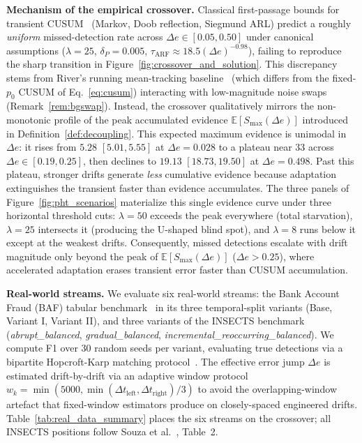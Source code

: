 \documentclass[10pt,conference]{IEEEtran}
\theoremstyle{definition}
\begin{document}
\textbf{Mechanism of the empirical crossover.}
Classical first-passage bounds for transient CUSUM~\cite{tartakovsky_2023_transient,tartakovsky_2014} (Markov, Doob reflection, Siegmund ARL) predict a roughly \emph{uniform} missed-detection rate across $\Delta e \in [0.05, 0.50]$ under canonical assumptions ($\lambda=25$, $\delta_P=0.005$, $\tau_{\mathrm{ARF}} \approx 18.5(\Delta e)^{-0.98}$), failing to reproduce the sharp transition in Figure~\ref{fig:crossover_and_solution}. This discrepancy stems from River's running mean-tracking baseline~\cite{montiel_river_2021} (which differs from the fixed-$p_0$ CUSUM of Eq.~\eqref{eq:cusum}) interacting with low-magnitude noise swaps (Remark~\ref{rem:bgswap}). Instead, the crossover qualitatively mirrors the non-monotonic profile of the peak accumulated evidence $\mathbb{E}[S_{\max}(\Delta e)]$ introduced in Definition~\ref{def:decoupling}. This expected maximum evidence is unimodal in $\Delta e$: it rises from $5.28$ $[5.01, 5.55]$ at $\Delta e = 0.028$ to a plateau near $33$ across $\Delta e \in [0.19, 0.25]$, then declines to $19.13$ $[18.73, 19.50]$ at $\Delta e = 0.498$. Past this plateau, stronger drifts generate \emph{less} cumulative evidence because adaptation extinguishes the transient faster than evidence accumulates. The three panels of Figure~\ref{fig:pht_scenarios} materialize this single evidence curve under three horizontal threshold cuts: $\lambda = 50$ exceeds the peak everywhere (total starvation), $\lambda = 25$ intersects it (producing the U-shaped blind spot), and $\lambda = 8$ runs below it except at the weakest drifts. Consequently, missed detections escalate with drift magnitude only beyond the peak of $\mathbb{E}[S_{\max}(\Delta e)]$ ($\Delta e > 0.25$), where accelerated adaptation erases transient error faster than CUSUM accumulation.

\textbf{Real-world streams.}
We evaluate six real-world streams: the Bank Account Fraud (BAF) tabular benchmark~\cite{jesus_baf_2022} in its three temporal-split variants (Base, Variant I, Variant II), and three variants of the INSECTS benchmark~\cite{souza_insects_2020} (\emph{abrupt\_balanced}, \emph{gradual\_balanced}, \emph{incremental\_reoccurring\_balanced}). We compute F1 over 30 random seeds per variant, evaluating true detections via a bipartite Hopcroft-Karp matching protocol~\cite{hopcroft_karp_1973}. The effective error jump $\Delta e$ is estimated drift-by-drift via an adaptive window protocol $w_k = \min(5000, \min(\Delta t_{\mathrm{left}}, \Delta t_{\mathrm{right}})/3)$ to avoid the overlapping-window artefact that fixed-window estimators produce on closely-spaced engineered drifts. Table~\ref{tab:real_data_summary} places the six streams on the crossover; all INSECTS positions follow Souza et al.~\cite{souza_insects_2020}, Table~2.
\end{document}
